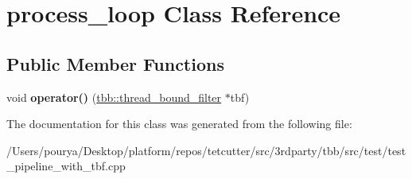 \hypertarget{classprocess__loop}{}\section{process\+\_\+loop Class Reference}
\label{classprocess__loop}
\subsection*{Public Member Functions}
\begin{DoxyCompactItemize}
\item 
\hypertarget{classprocess__loop_a998b79757ca3481e32855ec60a29606d}{}void {\bfseries operator()} (\hyperlink{classtbb_1_1thread__bound__filter}{tbb\+::thread\+\_\+bound\+\_\+filter} $\ast$tbf)\label{classprocess__loop_a998b79757ca3481e32855ec60a29606d}

\end{DoxyCompactItemize}


The documentation for this class was generated from the following file\+:\begin{DoxyCompactItemize}
\item 
/\+Users/pourya/\+Desktop/platform/repos/tetcutter/src/3rdparty/tbb/src/test/test\+\_\+pipeline\+\_\+with\+\_\+tbf.\+cpp\end{DoxyCompactItemize}
